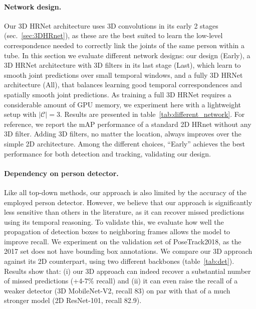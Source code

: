 \documentclass[10pt,twocolumn,letterpaper]{article}
\begin{document}
 \vspace{-3mm}
\paragraph{Network design.}
Our 3D HRNet architecture uses 3D convolutions in its early 2 stages (sec.~\ref{sec:3DHRnet}), as these are the best suited to learn the low-level correspondence needed to correctly link the joints of the same person within a tube. In this section we evaluate different network designs: our design (Early), a 3D HRNet architecture with 3D filters in its last stage (Last), which learn to smooth joint predictions over small temporal windows, and a fully 3D HRNet architecture (All), that balances learning good temporal correspondences and spatially smooth joint predictions.
As training a full 3D HRNet requires a considerable amount of GPU memory, we experiment here with a lightweight setup with $|\mathcal{C}|=3$. Results are presented in table~\ref{tab:different_network}. For reference, we report the mAP performance of a standard 2D HRnet without any 3D filter. Adding 3D filters, no matter the location, always improves over the simple 2D architecture. Among the different choices, ``Early'' achieves the best performance for both detection and tracking, validating our design.

 \vspace{-3mm}
\paragraph{Dependency on person detector.}
Like all top-down methods, our approach is also limited by the accuracy of the employed person detector. However, we believe that our approach is significantly less sensitive than others in the literature, as it can recover missed predictions using its temporal reasoning. To validate this, we evaluate how well the propagation of detection boxes to neighboring frames allows the model to improve recall. We experiment on the validation set of PoseTrack2018, as the 2017 set does not have bounding box annotations. We compare our 3D approach against its 2D counterpart, using two different backbones (table~\ref{tab:det}). Results show that: (i) our 3D approach can indeed recover a substantial number of missed predictions (+4-7\% recall) and (ii) it can even raise the recall of a weaker detector (3D MobileNet-V2, recall 83) on par with that of a much stronger model (2D ResNet-101, recall 82.9).

\begin{table}
\centering 
{}
\vspace{-3mm}
 \caption{\small \it Person bounding box recall on PoseTrack 2018. \vspace{-3mm}}
 \label{tab:det}
\end{table}
\end{document}
